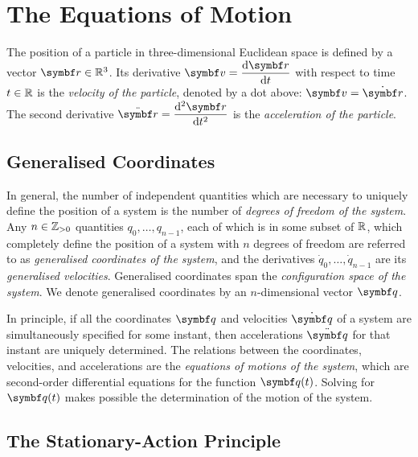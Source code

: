 



\section{The Equations of Motion}

The position of a particle in three-dimensional Euclidean space is defined by a vector \(\vct{r} \in \setreal^3\). Its
derivative \(\dis \vct{v} = \frac{\diff \vct{r}}{\diff t}\) with respect to time \(t \in \mathbb{R}\) is the
\emph{velocity of the particle}, denoted by a dot above: \(\vct{v} = \dot{\vct{r}}\). The second derivative \(\dis
\ddot{\vct{r}} = \frac{\diff^2 \vct{r}}{\diff t^2}\) is the \emph{acceleration of the particle}.

\subsection{Generalised Coordinates}

In general, the number of independent quantities which are necessary to uniquely define the position of a system is the
number of \emph{degrees of freedom of the system}. Any \(n \in \mathbb{Z}_{>0}\) quantities \(q_0, \ldots, q_{n - 1}\), each of
which is in some subset of \(\mathbb{R}\), which completely define the position of a system with \(n\) degrees of freedom
are referred to as \emph{generalised coordinates of the system}, and the derivatives \(\dot{q}_0, \ldots, \dot{q}_{n
- 1}\) are its \emph{generalised velocities}. Generalised coordinates span the \emph{configuration space of the system}.
We denote generalised coordinates by an \(n\)-dimensional vector \(\vct{q}\).

In principle, if all the coordinates \(\vct{q}\) and velocities \(\dot{\vct{q}}\) of a system are simultaneously
specified for some instant, then accelerations \(\ddot{\vct{q}}\) for that instant are uniquely determined. The
relations between the coordinates, velocities, and accelerations are the \emph{equations of motions of the system},
which are second-order differential equations for the function \(\vct{q}(t)\). Solving for \(\vct{q}(t)\) makes possible
the determination of the motion of the system.

\subsection{The Stationary-Action Principle}


